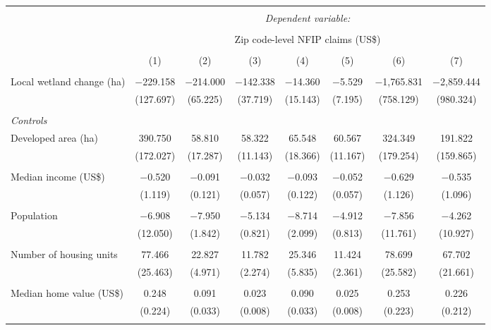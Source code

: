 \begin{tabular}{@{\extracolsep{5pt}}lccccccc} 
\\[-1.8ex]\hline 
\hline \\[-1.8ex] 
 & \multicolumn{7}{c}{\textit{Dependent variable:}} \\ 
\cline{2-8} 
\\[-1.8ex] & \multicolumn{7}{c}{Zip code-level NFIP claims (US\$)} \\ 
\\[-1.8ex] & (1) & (2) & (3) & (4) & (5) & (6) & (7)\\ 
\hline \\[-1.8ex] 
 Local wetland change (ha) & $-$229.158 & $-$214.000 & $-$142.338 & $-$14.360 & $-$5.529 & $-$1,765.831 & $-$2,859.444 \\ 
  & (127.697) & (65.225) & (37.719) & (15.143) & (7.195) & (758.129) & (980.324) \\ 
  & & & & & & & \\ 
 \emph{Controls} \\ Developed area (ha) & 390.750 & 58.810 & 58.322 & 65.548 & 60.567 & 324.349 & 191.822 \\ 
  & (172.027) & (17.287) & (11.143) & (18.366) & (11.167) & (179.254) & (159.865) \\ 
  & & & & & & & \\ 
 Median income (US\$) & $-$0.520 & $-$0.091 & $-$0.032 & $-$0.093 & $-$0.052 & $-$0.629 & $-$0.535 \\ 
  & (1.119) & (0.121) & (0.057) & (0.122) & (0.057) & (1.126) & (1.096) \\ 
  & & & & & & & \\ 
 Population & $-$6.908 & $-$7.950 & $-$5.134 & $-$8.714 & $-$4.912 & $-$7.856 & $-$4.262 \\ 
  & (12.050) & (1.842) & (0.821) & (2.099) & (0.813) & (11.761) & (10.927) \\ 
  & & & & & & & \\ 
 Number of housing units & 77.466 & 22.827 & 11.782 & 25.346 & 11.424 & 78.699 & 67.702 \\ 
  & (25.463) & (4.971) & (2.274) & (5.835) & (2.361) & (25.582) & (21.661) \\ 
  & & & & & & & \\ 
 Median home value (US\$) & 0.248 & 0.091 & 0.023 & 0.090 & 0.025 & 0.253 & 0.226 \\ 
  & (0.224) & (0.033) & (0.008) & (0.033) & (0.008) & (0.223) & (0.212) \\ 
  & & & & & & & \\ 

\end{tabular}
